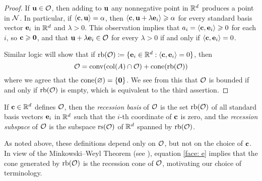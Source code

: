 \documentclass[11pt]{amsart}
\begin{document}
\begin{proof}
   If $\mathbf{u} \in \mathcal{O}$, then adding to $\mathbf{u}$ any nonnegative point in $\mathbb{R}^d$ produces a point in $\mathcal{N}$.
   In particular, if $\langle \mathbf{c}, \mathbf{u} \rangle = \alpha$, then $\langle \mathbf{c}, \mathbf{u} + \lambda \mathbf{e}_i \rangle \geqslant \alpha$ for every standard basis vector $\mathbf{e}_i$ in $\mathbb{R}^d$ and $\lambda > 0$.
   This observation implies that $a_i = \langle \mathbf{c}, \mathbf{e}_i \rangle \geqslant 0$ for each $i$, so $\mathbf{c} \geqslant \mathbf{0}$, and that $\mathbf{u} + \lambda \mathbf{e}_i \in \mathcal{O}$ for every $\lambda > 0$ if and only if $\langle \mathbf{c}, \mathbf{e}_i \rangle = 0$.

Similar logic will show that if $\operatorname{rb}(\mathcal{O}) \coloneqq  \{ \mathbf{e}_i \in \mathbb{R}^d : \langle \mathbf{c}, \mathbf{e}_i \rangle = 0\}$, then
\begin{equation}
\label{face: e}
\mathcal{O} =  \operatorname{conv}( \operatorname{col}(A) \cap \mathcal{O} ) + \operatorname{cone}(\operatorname{rb}(\mathcal{O}))
\end{equation}
where we agree that the $\operatorname{cone}(\varnothing) = \{\mathbf{0}\}$.  We see from this that $\mathcal{O}$ is bounded if and only if $\operatorname{rb}(\mathcal{O})$ is empty, which is equivalent to the third assertion.
\end{proof}

\begin{definition}
   If $\mathbf{c} \in \mathbb{R}^d$ defines $\mathcal{O}$, then the \emph{recession basis} of $\mathcal{O}$ is the set $\operatorname{rb}(\mathcal{O})$ of all standard basis vectors $\mathbf{e}_i$ in $\mathbb{R}^d$ such that the $i$-th coordinate of $\mathbf{c}$ is zero, and the \emph{recession subspace} of $\mathcal{O}$ is the subspace $\operatorname{rs}(\mathcal{O})$ of $\mathbb{R}^d$ spanned by $\operatorname{rb}(\mathcal{O})$.
\end{definition}

As noted above, these definitions depend only on $\mathcal{O}$, but not on the choice of $\mathbf{c}$.
In view of the Minkowski--Weyl Theorem (see ), equation \eqref{face: e} implies that the cone generated by $\operatorname{rb}(\mathcal{O})$ is the recession cone of $\mathcal{O}$, motivating our choice of terminology.
\end{document}
